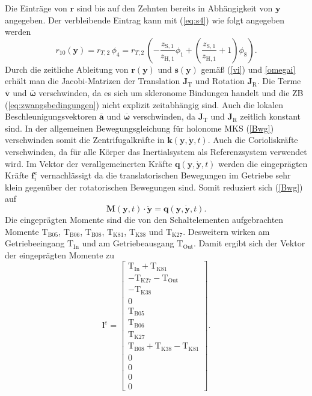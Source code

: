 Die Einträge von $\pmb{r}$ sind bis auf den Zehnten bereits in Abhängigkeit von $\pmb{y}$ angegeben. Der verbleibende Eintrag kann mit (\ref{eq:s4}) wie folgt angegeben werden
\begin{equation}
r_{10}(\pmb{y}) = r_{T,2}\,\phi_4 = r_{T,2}\,\left(-\frac{z_{\mathrm{S,1}} }{z_{\mathrm{H,1}} } \phi_1 +\left(\frac{z_{\mathrm{S,1}} }{z_{\mathrm{H,1}} }+1\right) \phi_8\right).
\end{equation}
Durch die zeitliche Ableitung von $\pmb{r}(\pmb{y})$ und $\pmb{s}(\pmb{y})$ gemäß (\ref{vi}) und \ref{omegai} erhält man die Jacobi-Matrizen der Translation $\pmb{J}_\mathrm{T}$ und Rotation $\pmb{J}_\mathrm{R}$. Die Terme $\overline{\pmb{v}}$ und $\overline{\pmb{\omega}}$ verschwinden, da es sich um skleronome Bindungen handelt und die ZB (\ref{eq:zwangsbedingungen}) nicht explizit zeitabhängig sind. Auch die lokalen Beschleunigungsvektoren $\overline{\pmb{a}}$ und $\overline{\pmb{\omega}}$ verschwinden, da $\pmb{J}_\mathrm{T}$ und $\pmb{J}_\mathrm{R}$ zeitlich konstant sind. In der allgemeinen Bewegungsgleichung für holonome MKS (\ref{Bwg}) verschwinden somit die Zentrifugalkräfte in $\pmb{k}(\pmb{y},\dot{\pmb{y}},t)$. Auch die Corioliskräfte verschwinden, da für alle Körper das Inertialsystem als Referenzsystem verwendet wird.%
 Im Vektor der verallgemeinerten Kräfte $\pmb{q}(\pmb{y},\dot{\pmb{y}},t)$ werden die eingeprägten Kräfte $\pmb{f}^e_i$ vernachlässigt da die translatorischen Bewegungen im Getriebe sehr klein gegenüber der rotatorischen Bewegungen sind. Somit reduziert sich (\ref{Bwg}) auf
\begin{equation}
\pmb{M}(\pmb{y},t)\cdot\ddot{\pmb{y}} = \pmb{q}(\pmb{y},\dot{\pmb{y}},t).
\end{equation}  
Die eingeprägten Momente sind die von den Schaltelementen aufgebrachten Momente $\mathrm{T}_{\mathrm{B05}}$, $\mathrm{T}_{\mathrm{B06}}$, $\mathrm{T}_{\mathrm{B08}}$, $\mathrm{T}_{\mathrm{K81}}$, $\mathrm{T}_{\mathrm{K38}}$ und $\mathrm{T}_{\mathrm{K27}}$. Desweitern wirken am Getriebeeingang $\mathrm{T}_{\mathrm{In}}$ und am Getriebeausgang $\mathrm{T}_{\mathrm{Out}}$. Damit ergibt sich der Vektor der eingeprägten Momente zu
\begin{equation}\label{eq:le}
\mathrm{\pmb{l}}^e = \begin{bmatrix} \mathrm{T}_{\mathrm{In}}+\mathrm{T}_{\mathrm{K81}} \\ -\mathrm{T}_{\mathrm{K27}}-\mathrm{T}_{\mathrm{Out}} \\ -\mathrm{T}_{\mathrm{K38}} \\ 0 \\ \mathrm{T}_{\mathrm{B05}} \\ \mathrm{T}_{\mathrm{B06}} \\ \mathrm{T}_{\mathrm{K27}} \\ \mathrm{T}_{\mathrm{B08}}+\mathrm{T}_{\mathrm{K38}}-\mathrm{T}_{\mathrm{K81}} \\ 0 \\ 0 \\ 0 \\ 0 \end{bmatrix}.
\end{equation}
